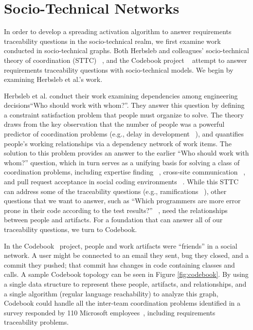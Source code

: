\section{Socio-Technical Networks}
In order to develop a spreading activation algorithm to answer requirements traceability questions in the socio-technical realm, we first examine work conducted in socio-technical graphs. Both Herbsleb and colleagues' socio-technical theory of coordination (STTC) ~\cite{herbsleb16}, and the Codebook project ~\cite{codebook} attempt to answer requirements traceability questions with socio-technical models. We begin by examining Herbsleb et al.'s work.

Herbsleb et al. conduct their work examining dependencies among engineering decisions\textemdash ``Who should work with whom?''. They answer this question by defining a constraint satisfaction problem that people must organize to solve. The theory draws from the key observation that the number of people was a powerful predictor of coordination problems (e.g., delay in development ~\cite{herbsleb03}), and quantifies people’s working relationships via a dependency network of work items. The solution to this problem provides an answer to the earlier ``Who should work with whom?'' question, which in turn serves as a unifying basis for solving a class of coordination problems, including expertise finding ~\cite{herbsleb02,herbsleb09}, cross-site communication ~\cite{herbsleb01}, and pull request acceptance in social coding environments ~\cite{herbsleb14}. While this STTC can address some of the traceability questions (e.g., ramifications ~\cite{ICSE30}), other questions that we want to answer, such as ``Which programmers are more error prone in their code according to the test results?'' ~\cite{lohar16}, need the relationships between people and artifacts. For a foundation that can answer all of our traceability questions, we turn to Codebook.

In the Codebook~\cite{codebook} project, people and work artifacts were ``friends'' in a social network. A user might be connected to an email they sent, bug they closed, and a commit they pushed; that commit has changes in code containing classes and calls. A sample Codebook topology can be seen in Figure \ref{fig:codebook}. By using a single data structure to represent these people, artifacts, and relationships, and a single algorithm (regular language reachability) to analyze this graph, Codebook could handle all the inter-team coordination problems identified in a survey responded by 110 Microsoft employees~\cite{codebook10}, including requirements traceability problems. 

